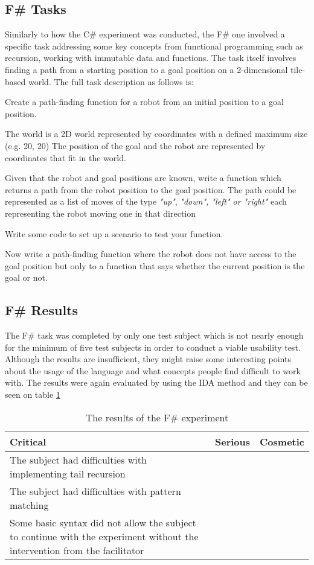 \subsection{F\# Tasks}
\label{subsection:F Task}
Similarly to how the C\# experiment was conducted, the F\# one involved a specific task addressing some key concepts from functional programming such as recursion, working with immutable data and functions.
The task itself involves finding a path from a starting position to a goal position on a 2-dimensional tile-based world. The full task description as follows is:

Create a path-finding function for a robot from an initial position to a goal position.

The world is a 2D world represented by coordinates with a defined maximum size (e.g. 20, 20)
The position of the goal and the robot are represented by coordinates that fit in the world.

Given that the robot and goal positions are known, write a function which returns a path from the robot position to the goal position.
The path could be represented as a list of moves of the type \textit{"up"}, \textit{"down", "left" or "right"} each representing the robot moving one in that direction

Write some code to set up a scenario to test your function.

Now write a path-finding function where the robot does not have access to the goal position but only to a function that says whether the current position is the goal or not.


\subsection{F\# Results}
The F\# task was completed by only one test subject which is not nearly enough for the minimum of five test subjects in order to conduct a viable usability test. Although the results are insufficient, they might raise some interesting points about the usage of the language and what concepts people find difficult to work with. The results were again evaluated by using the IDA method and they can be seen on table \ref{F-usability-results}

\begin{table} [!h]
\centering
\renewcommand{\arraystretch}{1.5}
\label{F-usability-results}
\begin{tabular}{| p{5cm} | p{5cm} | p{5cm} |}
\hline
Critical & Serious     & Cosmetic \\ \hline
	The subject had difficulties with implementing tail recursion	 &  &  \\ \hline 
The subject had difficulties with pattern matching & &  \\ \hline
Some basic syntax did not allow the subject to continue with the experiment without the intervention from the facilitator & &  \\ \hline
\end{tabular}
\caption{The results of the F\# experiment}
\end{table}


